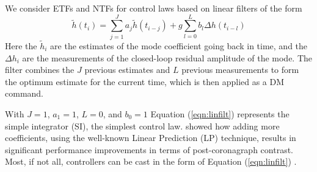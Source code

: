 \documentclass[10pt,preprint]{aastex631}
\begin{document}
We consider ETFs and NTFs for control laws based on linear filters of the form
\begin{equation}
\widetilde{h} (t_i) = \sum_{j=1}^J a_j \widetilde{h}(t_{i-j}) + g\sum_{l=0}^L b_l \Delta h (t_{i-l})  
\label{eqn:linfilt}
\end{equation}
Here the $\widetilde{h}_i$ are the estimates of the mode coefficient going back in time, and  the $\Delta h_i$ are the measurements of the closed-loop residual amplitude of the mode.  The filter combines the $J$ previous estimates and $L$ previous measurements to form the optimum estimate for the current time, which is then applied as a DM command.  

With $J=1$, $a_1 = 1$, $L=0$, and $b_0 = 1$ Equation (\ref{eqn:linfilt}) represents the simple integrator (SI), the simplest control law.  \citet{2018JATIS...4a9001M} showed how adding more coefficients, using the well-known Linear Prediction (LP) technique, results in significant performance improvements in terms of post-coronagraph contrast.  Most, if not all, controllers can be cast in the form of Equation (\ref{eqn:linfilt}) \citep{2007JOSAA..24.2645P}. 



% 
% 
% 
\end{document}
